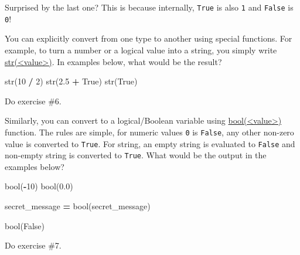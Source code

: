 \documentclass[
]{book}
\newenvironment{Shaded}{\begin{snugshade}}{\end{snugshade}}
\newcommand{\BuiltInTok}[1]{#1}
\newcommand{\DecValTok}[1]{\textcolor[rgb]{0.00,0.00,0.81}{#1}}
\newcommand{\FloatTok}[1]{\textcolor[rgb]{0.00,0.00,0.81}{#1}}
\newcommand{\NormalTok}[1]{#1}
\newcommand{\OperatorTok}[1]{\textcolor[rgb]{0.81,0.36,0.00}{\textbf{#1}}}
\newcommand{\StringTok}[1]{\textcolor[rgb]{0.31,0.60,0.02}{#1}}
\newcommand{\VariableTok}[1]{\textcolor[rgb]{0.00,0.00,0.00}{#1}}
\begin{document}
Surprised by the last one? This is because internally, \texttt{True} is also \texttt{1} and \texttt{False} is \texttt{0}!

You can explicitly convert from one type to another using special functions. For example, to turn a number or a logical value into a string, you simply write \href{https://docs.python.org/3/library/functions.html\#func-str}{str(\textless value\textgreater)}. In examples below, what would be the result?

\begin{Shaded}
\begin{Highlighting}[]
\BuiltInTok{str}\NormalTok{(}\DecValTok{10} \OperatorTok{/} \DecValTok{2}\NormalTok{)}
\BuiltInTok{str}\NormalTok{(}\FloatTok{2.5} \OperatorTok{+} \VariableTok{True}\NormalTok{)}
\BuiltInTok{str}\NormalTok{(}\VariableTok{True}\NormalTok{)}
\end{Highlighting}
\end{Shaded}

Do exercise \#6.

Similarly, you can convert to a logical/Boolean variable using \href{https://docs.python.org/3/library/functions.html\#bool}{bool(\textless value\textgreater)} function. The rules are simple, for numeric values \texttt{0} is \texttt{False}, any other non-zero value is converted to \texttt{True}. For string, an empty string \texttt{\textquotesingle{}\textquotesingle{}} is evaluated to \texttt{False} and non-empty string is converted to \texttt{True}. What would be the output in the examples below?

\begin{Shaded}
\begin{Highlighting}[]
\BuiltInTok{bool}\NormalTok{(}\OperatorTok{{-}}\DecValTok{10}\NormalTok{)}
\BuiltInTok{bool}\NormalTok{(}\FloatTok{0.0}\NormalTok{)}

\NormalTok{secret\_message }\OperatorTok{=} \StringTok{\textquotesingle{}\textquotesingle{}}
\BuiltInTok{bool}\NormalTok{(secret\_message)}

\BuiltInTok{bool}\NormalTok{(}\StringTok{\textquotesingle{}False\textquotesingle{}}\NormalTok{)}
\end{Highlighting}
\end{Shaded}

Do exercise \#7.
\end{document}
